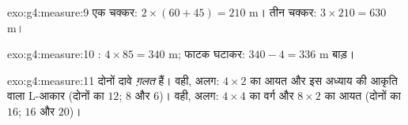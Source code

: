 \begin{solution}{exo:g4:measure:9}
एक चक्कर: $2 \times (60 + 45) = 210$ m। तीन चक्कर:
$3 \times 210 = 630$ m।
\end{solution}

\begin{solution}{exo:g4:measure:10}
: $4 \times 85 = 340$ m; फाटक घटाकर:
$340 - 4 = 336$ m बाड़।
\end{solution}

\begin{solution}{exo:g4:measure:11}
दोनों दावे \emph{ग़लत} हैं।  वही,  अलग:
$4 \times 2$ का आयत और इस अध्याय की आकृति वाला L-आकार (दोनों का
 $12$;  $8$ और $6$)।  वही, 
अलग: $4 \times 4$ का वर्ग और $8 \times 2$ का आयत
(दोनों का  $16$;  $16$ और $20$)।

\end{solution}
